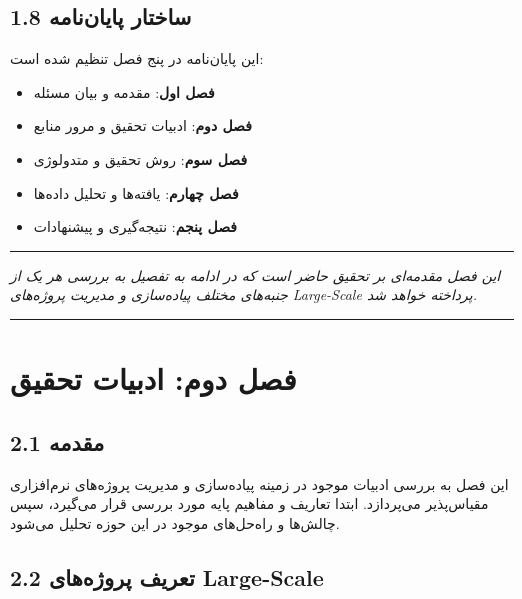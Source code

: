 \documentclass[
]{article}
\providecommand{\tightlist}{%
  \setlength{\itemsep}{0pt}\setlength{\parskip}{0pt}}
\begin{document}
\subsection{1.8 ساختار
پایان‌نامه}\label{ux633ux627ux62eux62aux627ux631-ux67eux627ux6ccux627ux646ux646ux627ux645ux647}

این پایان‌نامه در پنج فصل تنظیم شده است:

\begin{itemize}
\tightlist
\item
  \textbf{فصل اول}: مقدمه و بیان مسئله
\item
  \textbf{فصل دوم}: ادبیات تحقیق و مرور منابع
\item
  \textbf{فصل سوم}: روش تحقیق و متدولوژی
\item
  \textbf{فصل چهارم}: یافته‌ها و تحلیل داده‌ها
\item
  \textbf{فصل پنجم}: نتیجه‌گیری و پیشنهادات
\end{itemize}

\begin{center}\rule{0.5\linewidth}{0.5pt}\end{center}

\emph{این فصل مقدمه‌ای بر تحقیق حاضر است که در ادامه به تفصیل به بررسی هر
یک از جنبه‌های مختلف پیاده‌سازی و مدیریت پروژه‌های Large-Scale پرداخته
خواهد شد.}

\begin{center}\rule{0.5\linewidth}{0.5pt}\end{center}

\section{فصل دوم: ادبیات
تحقیق}\label{ux641ux635ux644-ux62fux648ux645-ux627ux62fux628ux6ccux627ux62a-ux62aux62dux642ux6ccux642}

\subsection{2.1 مقدمه}\label{ux645ux642ux62fux645ux647}

این فصل به بررسی ادبیات موجود در زمینه پیاده‌سازی و مدیریت پروژه‌های
نرم‌افزاری مقیاس‌پذیر می‌پردازد. ابتدا تعاریف و مفاهیم پایه مورد بررسی قرار
می‌گیرد، سپس چالش‌ها و راه‌حل‌های موجود در این حوزه تحلیل می‌شود.

\subsection{2.2 تعریف پروژه‌های
Large-Scale}\label{ux62aux639ux631ux6ccux641-ux67eux631ux648ux698ux647ux647ux627ux6cc-large-scale}
\end{document}
